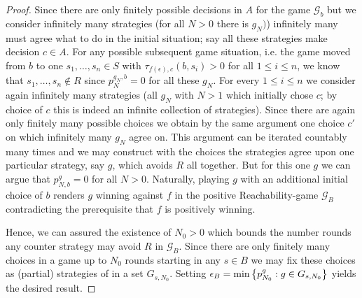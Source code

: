 \begin{proof}
  Since there are only finitely possible decisions in $A$ for the game 
  $\mathcal{G}_{b}$ but we consider infinitely many strategies (for all $N>0$ 
  there is $g_{N})$) infinitely many must agree what to do in the initial 
  situation; say all these strategies make decision $c\in A$. For any 
  possible subsequent game situation, i.e. the game moved from $b$ to 
  one $s_{1},\dots, s_{n}\in S$ with $\tau_{f(\epsilon), c}(b, s_{i}) > 0$ 
  for all $1\leq i\leq n$, we know that $s_{1},\dots, s_{n}\not\in R$ since
  $p_{N}^{g_{N}, b} = 0$ for all these $g_{N}$. For every $1\leq i\leq n$ we 
  consider again infinitely many strategies (all $g_{N}$ with $N>1$ which 
  initially chose $c$; by choice of $c$ this is indeed an infinite collection
  of strategies). Since there are again only finitely many possible choices 
  we obtain by the same argument one choice $c'$ on which infinitely many 
  $g_{N}$ agree on. This argument can be iterated countably many times and we 
  may construct with the choices the strategies agree upon one particular 
  strategy, say $g$, which avoids $R$ all together. But for this one $g$ we
  can argue that $p_{N, b}^{g} = 0$ for all $N>0$. Naturally, playing $g$ 
  with an additional initial choice of $b$ renders $g$ winning against $f$ in
  the positive Reachability-game $\mathcal{G}_{B}$ contradicting the 
  prerequisite that $f$ is positively winning.

  Hence, we can assured the existence of $N_{0} > 0$ which bounds the number
  rounds any counter strategy may avoid $R$ in $\mathcal{G}_{B}$. Since there
  are only finitely many choices in a game up to $N_{0}$ rounds starting in
  any $s\in B$ we may fix these choices as (partial) strategies of \adam{} in a
  set $G_{s,N_{0}}$. Setting 
  $\epsilon_{B} = \min\left\{p^{g}_{N_{0}}:g\in G_{s, N_{0}}\right\}$ yields the desired 
  result.
\end{proof}

